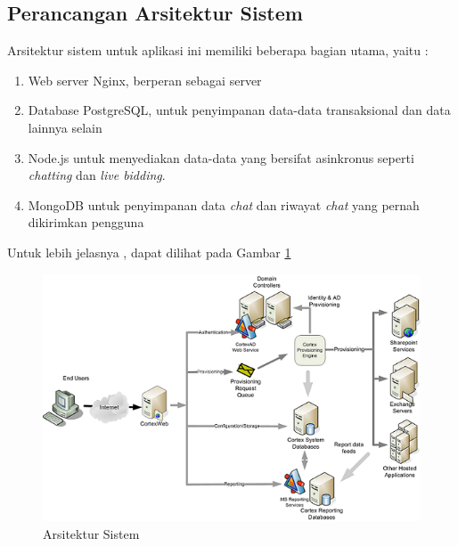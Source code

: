   \subsection{Perancangan Arsitektur Sistem}
	Arsitektur sistem untuk aplikasi ini memiliki beberapa bagian utama, yaitu :
    \
\begin{enumerate}
\item Web server Nginx, berperan sebagai server
\item Database PostgreSQL, untuk penyimpanan data-data transaksional dan data lainnya selain 
\item Node.js untuk menyediakan data-data yang bersifat asinkronus seperti \textit{chatting} dan \textit{live bidding}.
\item MongoDB untuk penyimpanan data \textit{chat} dan riwayat \textit{chat} yang pernah dikirimkan pengguna
\end{enumerate}
	Untuk lebih jelasnya , dapat dilihat pada Gambar \ref{sysarch}
      \begin{figure}[H]
        \centering
        \includegraphics[width=\linewidth]{images/bab3/system-architecture.jpg}
        \caption{Arsitektur Sistem}
        \label{sysarch}
      \end{figure}